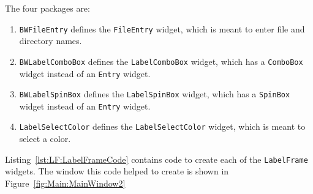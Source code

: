 The four packages are:
\begin{enumerate}
\item \lstinline=BWFileEntry= defines the \lstinline=FileEntry= widget,
which is meant to enter file and directory names.
\item \lstinline=BWLabelComboBox= defines the \lstinline=LabelComboBox=
widget, which has a \lstinline=ComboBox= widget instead of an
\lstinline=Entry= widget.
\item \lstinline=BWLabelSpinBox= defines the \lstinline=LabelSpinBox=
widget, which has a \lstinline=SpinBox= widget instead of an
\lstinline=Entry= widget.
\item \lstinline=LabelSelectColor= defines the
\lstinline=LabelSelectColor= widget, which is meant to select a color.
\end{enumerate}


Listing~\ref{lst:LF:LabelFrameCode} contains code to create each of the
\lstinline=LabelFrame= widgets.  The window this code helped to create
is shown in Figure~\ref{fig:Main:MainWindow2}
